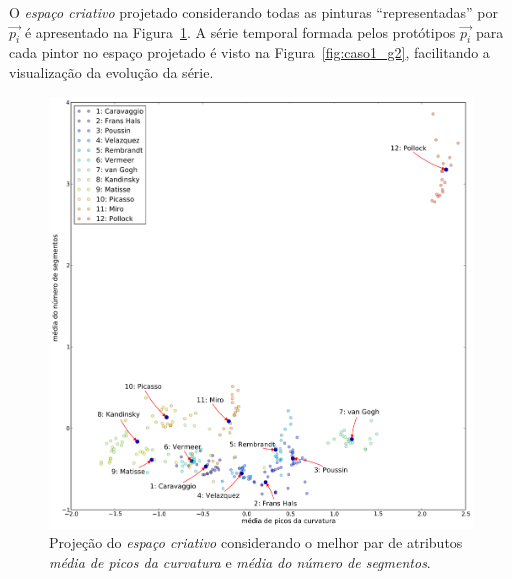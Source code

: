 O \textit{espaço criativo} projetado considerando todas as pinturas
``representadas'' por $\vec{p_i}$ é apresentado na
Figura~\ref{fig:caso1_g1}. A série temporal formada pelos protótipos
$\vec{p_i}$ para cada pintor no espaço projetado é visto na
Figura~\ref{fig:caso1_g2}, facilitando a visualização da evolução da
série. 

\begin{figure}[h!]
\begin{center}
        \includegraphics[scale=.5]{figs/caso1_g1}
      \caption{Projeção do \textit{espaço criativo} considerando o
        melhor par de atributos \emph{média de picos da curvatura} e
        \emph{média do número de segmentos}.}
        \label{fig:caso1_g1}
\end{center}
\end{figure}

